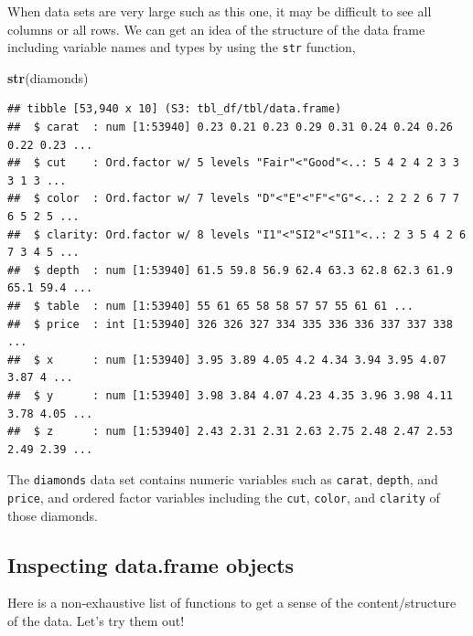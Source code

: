 \documentclass[
]{article}
\newenvironment{Shaded}{\begin{snugshade}}{\end{snugshade}}
\newcommand{\KeywordTok}[1]{\textcolor[rgb]{0.13,0.29,0.53}{\textbf{#1}}}
\newcommand{\NormalTok}[1]{#1}
\begin{document}
When data sets are very large such as this one, it may be difficult to
see all columns or all rows. We can get an idea of the structure of the
data frame including variable names and types by using the \texttt{str}
function,

\begin{Shaded}
\begin{Highlighting}[]
\KeywordTok{str}\NormalTok{(diamonds)}
\end{Highlighting}
\end{Shaded}

\begin{verbatim}
## tibble [53,940 x 10] (S3: tbl_df/tbl/data.frame)
##  $ carat  : num [1:53940] 0.23 0.21 0.23 0.29 0.31 0.24 0.24 0.26 0.22 0.23 ...
##  $ cut    : Ord.factor w/ 5 levels "Fair"<"Good"<..: 5 4 2 4 2 3 3 3 1 3 ...
##  $ color  : Ord.factor w/ 7 levels "D"<"E"<"F"<"G"<..: 2 2 2 6 7 7 6 5 2 5 ...
##  $ clarity: Ord.factor w/ 8 levels "I1"<"SI2"<"SI1"<..: 2 3 5 4 2 6 7 3 4 5 ...
##  $ depth  : num [1:53940] 61.5 59.8 56.9 62.4 63.3 62.8 62.3 61.9 65.1 59.4 ...
##  $ table  : num [1:53940] 55 61 65 58 58 57 57 55 61 61 ...
##  $ price  : int [1:53940] 326 326 327 334 335 336 336 337 337 338 ...
##  $ x      : num [1:53940] 3.95 3.89 4.05 4.2 4.34 3.94 3.95 4.07 3.87 4 ...
##  $ y      : num [1:53940] 3.98 3.84 4.07 4.23 4.35 3.96 3.98 4.11 3.78 4.05 ...
##  $ z      : num [1:53940] 2.43 2.31 2.31 2.63 2.75 2.48 2.47 2.53 2.49 2.39 ...
\end{verbatim}

The \texttt{diamonds} data set contains numeric variables such as
\texttt{carat}, \texttt{depth}, and \texttt{price}, and ordered factor
variables including the \texttt{cut}, \texttt{color}, and
\texttt{clarity} of those diamonds.

\hypertarget{inspecting-data.frame-objects}{%
\subsection{Inspecting data.frame
objects}\label{inspecting-data.frame-objects}}

Here is a non-exhaustive list of functions to get a sense of the
content/structure of the data. Let's try them out!
\end{document}
